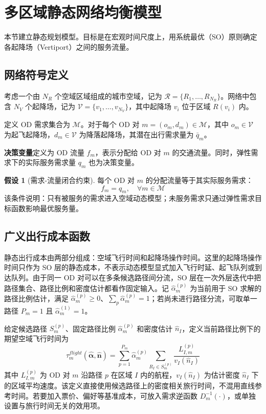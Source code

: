 \documentclass[a4paper,12pt]{article}
\theoremstyle{plain}
\theoremstyle{definition}
\newtheorem{assumption}[theorem]{假设}
\theoremstyle{remark}
\begin{document}
\section{多区域静态网络均衡模型}

本节建立静态规划模型。目标是在宏观时间尺度上，用系统最优（SO）原则确定各起降场（Vertiport）之间的服务流量。

\subsection{网络符号定义}
考虑一个由 $N_R$ 个空域区域组成的城市空域，记为 $\mathcal{R} = \{R_1, \dots, R_{N_R}\}$。网络中包含 $N_V$ 个起降场，记为 $\mathcal{V} = \{v_1, \dots, v_{N_V}\}$，其中起降场 $v_i$ 位于区域 $R(v_i)$ 内。

定义 OD 需求集合为 $\mathcal{M}$。对于每个 OD 对 $m = (o_m, d_m) \in \mathcal{M}$，其中 $o_m \in \mathcal{V}$ 为起飞起降场，$d_m \in \mathcal{V}$ 为降落起降场，其潜在出行需求量为 $\bar{q}_m$。

\textbf{决策变量}定义为 OD 流量 $f_m$，表示分配给 OD 对 $m$ 的交通流量。同时，弹性需求下的实际服务需求量 $q_m$ 也为决策变量。

\begin{assumption}[需求-流量闭合约束]\label{asm:flow_demand}
每个 OD 对 $m$ 的分配流量等于其实际服务需求：
\begin{equation}\label{eq:flow_demand}
    f_m = q_m, \quad \forall m \in \mathcal{M}
\end{equation}
该条件说明：只有被服务的需求进入空域动态模型；未服务需求只通过弹性需求目标函数影响最优服务量。
\end{assumption}

\subsection{广义出行成本函数}
静态出行成本由两部分组成：空域飞行时间和起降场操作时间。这里的起降场操作时间只作为 SO 层的静态成本，不表示动态模型显式加入飞行时延、起飞队列或到达队列。由于同一 OD 对可以在多条候选路径间分流，SO 层在一次外层迭代中把路径集合、路径比例和密度估计都看作固定输入。记 $\widehat\alpha_m^{(p)}$ 为当前用于 SO 求解的路径比例估计，满足 $\widehat\alpha_m^{(p)}\ge0$、$\sum_p\widehat\alpha_m^{(p)}=1$；若尚未进行路径分流，可取单一路径 $P_m=1$ 且 $\widehat\alpha_m^{(1)}=1$。

给定候选路径 $S_m^{(p)}$、固定路径比例 $\widehat\alpha_m^{(p)}$ 和密度估计 $\hat n_I$，定义当前路径比例下的期望空域飞行时间为
\begin{equation}\label{eq:air_flight_time}
    \tau_m^{flight}(\widehat{\bm\alpha},\hat{\bm n})
    =
    \sum_{p=1}^{P_m}\widehat\alpha_m^{(p)}
    \sum_{R_I \in S_m^{(p)}} \frac{L_{I,m}^{(p)}}{v_I(\hat{n}_I)}
\end{equation}
其中 $L_{I,m}^{(p)}$ 为 OD 对 $m$ 沿路径 $p$ 在区域 $I$ 内的航程，$v_I(\hat{n}_I)$ 为估计密度 $\hat{n}_I$ 下的区域平均速度。该定义直接使用候选路径上的密度相关旅行时间，不混用直线参考时间。若要加入票价、偏好等基准成本，可放入需求逆函数 $D_m^{-1}(\cdot)$，或单独设置与旅行时间无关的效用项。
\end{document}
